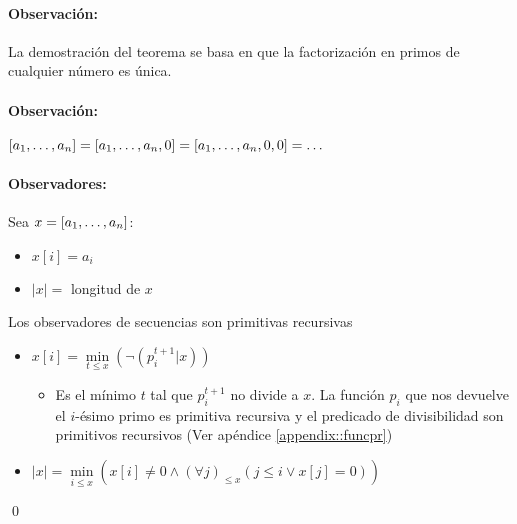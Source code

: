 \paragraph{Observación:} La demostración del teorema se basa en que la factorización en primos de cualquier número es única.

\paragraph{Observación:} $[a_1,\dots, a_{n}] = [a_1,\dots, a_{n},0] = [a_1,\dots, a_{n},0,0]= \dots$

\paragraph{Observadores:} Sea $x=[a_1,\dots, a_{n}]$:
\begin{itemize}
	\item $x[i] = a_i$
	\item $|x| =$ longitud de $x$
\end{itemize}

\begin{proposicion}\label{proposicion::observadoresSecuenciaSonPR}
Los observadores de secuencias son primitivas recursivas
\end{proposicion}

\begin{demo}
	\begin{itemize}
		\item $x[i] = \min\limits_{t\leq x}\left(\lnot\left(p_i^{t+1}|x\right)\right)$
			\begin{itemize}
				\item [] Es el mínimo $t$ tal que $p_i^{t+1}$ no divide a $x$. La función $p_i$ que nos devuelve el $i$-ésimo primo es primitiva recursiva y el predicado de divisibilidad son primitivos recursivos (Ver apéndice \ref{appendix::funcpr})
			\end{itemize}
		\item $|x| = \min\limits_{i\leq x}\left(x[i]\neq 0 \land \left(\forall j\right)_{\leq x} \left(j\leq i \lor x[j] = 0\right)\right)$
	\end{itemize}\qed
\end{demo}
